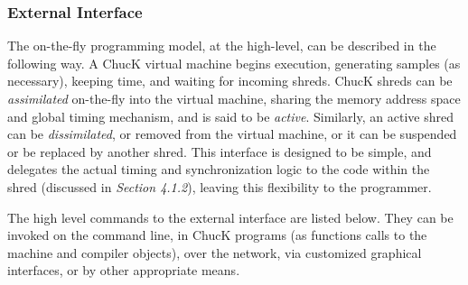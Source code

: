 \subsubsection{External Interface}

The on-the-fly programming model, at the high-level, can be described in the
following way.  A ChucK virtual machine begins execution, generating samples (as
necessary), keeping time, and waiting for incoming shreds.  ChucK shreds can be
\textit{assimilated} on-the-fly into the virtual machine, sharing the memory
address space and global timing mechanism, and is said to be \textit{active}. 
Similarly, an active shred can be \textit{dissimilated}, or removed from the
virtual machine, or it can be suspended or be replaced by another shred.  This
interface is designed to be simple, and delegates the actual timing and
synchronization logic to the code within the shred (discussed in \textit{Section
4.1.2}), leaving this flexibility to the programmer.

The high level commands to the external interface are listed below.  They can be
invoked on the command line, in ChucK programs (as functions calls to the {\small
machine} and {\small compiler} objects), over the network, via customized
graphical interfaces, or by other appropriate means.

